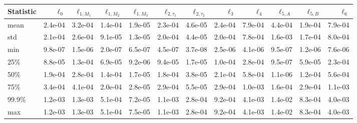 \begin{tabular}{lrrrrrrrrrrr}
\toprule
Statistic & $\ell_0$ & $\ell_{1,M_1}$ & $\ell_{1,M_2}$ & $\ell_{1,M_3}$ & $\ell_{2,\tau_1}$ & $\ell_{2,\tau_2}$ & $\ell_3$ & $\ell_4$ & $\ell_{5,A}$ & $\ell_{5,B}$ & $\ell_6$ \\
\midrule
mean & 2.4e-04 & 3.2e-04 & 1.4e-04 & 1.9e-05 & 2.3e-04 & 4.6e-05 & 2.4e-04 & 7.9e-04 & 4.4e-04 & 1.9e-04 & 7.9e-04 \\
std & 2.1e-04 & 2.6e-04 & 9.1e-05 & 1.3e-05 & 2.0e-04 & 4.4e-05 & 2.0e-04 & 7.8e-04 & 1.6e-03 & 1.7e-04 & 8.0e-04 \\
min & 9.8e-07 & 1.5e-06 & 2.0e-07 & 6.5e-07 & 4.5e-07 & 3.7e-08 & 2.5e-06 & 4.1e-06 & 9.5e-07 & 1.2e-06 & 7.6e-06 \\
25\% & 8.8e-05 & 1.3e-04 & 6.9e-05 & 9.2e-06 & 9.4e-05 & 1.7e-05 & 1.0e-04 & 2.8e-04 & 9.5e-07 & 5.9e-05 & 2.3e-04 \\
50\% & 1.9e-04 & 2.8e-04 & 1.4e-04 & 1.7e-05 & 1.8e-04 & 3.8e-05 & 2.1e-04 & 5.8e-04 & 1.1e-06 & 1.2e-04 & 5.6e-04 \\
75\% & 3.4e-04 & 4.1e-04 & 2.0e-04 & 2.8e-05 & 2.9e-04 & 5.5e-05 & 2.9e-04 & 1.0e-03 & 1.6e-04 & 2.9e-04 & 1.1e-03 \\
99.9\% & 1.2e-03 & 1.3e-03 & 5.1e-04 & 7.2e-05 & 1.1e-03 & 2.8e-04 & 9.2e-04 & 4.1e-03 & 1.4e-02 & 8.3e-04 & 4.0e-03 \\
max & 1.2e-03 & 1.3e-03 & 5.1e-04 & 7.5e-05 & 1.1e-03 & 2.8e-04 & 9.2e-04 & 4.1e-03 & 1.4e-02 & 8.3e-04 & 4.0e-03 \\
\bottomrule
\end{tabular}
